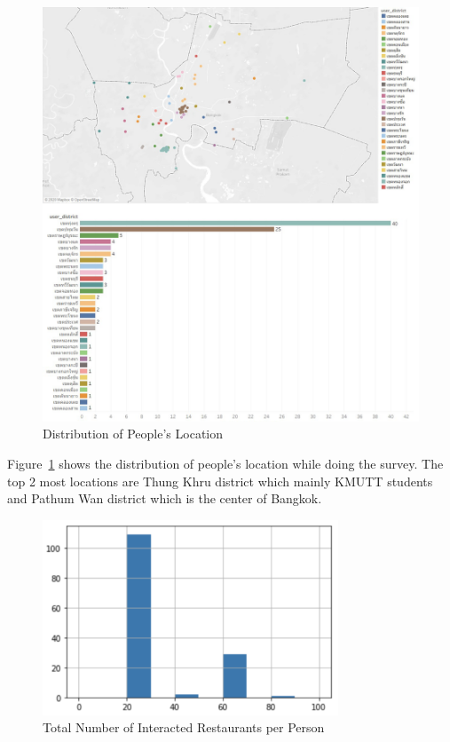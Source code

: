 \documentclass[12pt,oneside,openright,a4paper]{cpe-english-project}
\begin{document}
\begin{figure}[H]\centering
\includegraphics[width=450pt]{./images/4DistributionofPeoplesLocation.png}
\caption{Distribution of People’s Location}\label{fig:4DistributionofPeoplesLocation}
\end{figure}\vspace{-24pt}

Figure~\ref{fig:4DistributionofPeoplesLocation} shows the distribution of people’s location while doing the survey. The top 2 most locations are Thung Khru district which mainly KMUTT students and Pathum Wan district which is the center of Bangkok.

\begin{figure}[H]\centering
\includegraphics[width=250pt]{./images/4TotalNumberofInteractedRestaurantsperPerson.png}
\caption{Total Number of Interacted Restaurants per Person}\label{fig:4TotalNumberofInteractedRestaurantsperPerson}
\end{figure}\vspace{-24pt}
\end{document}
